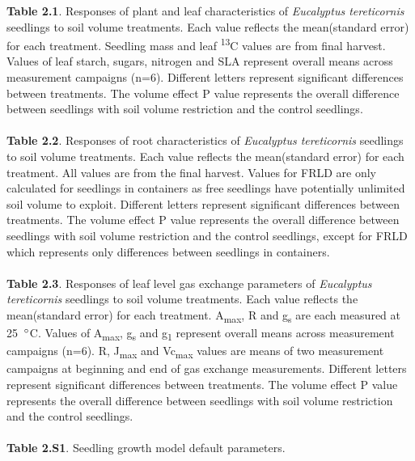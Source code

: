 \documentclass[a4paper]{article}\usepackage[]{graphicx}\usepackage[]{color}
\begin{document}
\textbf{Table 2.1}. Responses of plant and leaf characteristics of \textit{Eucalyptus tereticornis} seedlings to soil volume treatments. Each value reflects the mean(standard error) for each treatment. Seedling mass and leaf {\textdelta}\textsuperscript{13}C values are from final harvest. Values of leaf starch, sugars, nitrogen and SLA represent overall means across measurement campaigns (n=6). Different letters represent significant differences between treatments. The volume effect P value represents the overall difference between seedlings with soil volume restriction and the control seedlings.
\\
\\
\textbf{Table 2.2}. Responses of root characteristics of \textit{Eucalyptus tereticornis} seedlings to soil volume treatments. Each value reflects the mean(standard error) for each treatment. All values are from the final harvest. Values for FRLD are only calculated for seedlings in containers as free seedlings have potentially unlimited soil volume to exploit. Different letters represent significant differences between treatments. The volume effect P value represents the overall difference between seedlings with soil volume restriction and the control seedlings, except for FRLD which represents only differences between seedlings in containers.
\\
\\
\textbf{Table 2.3}. Responses of leaf level gas exchange parameters of \textit{Eucalyptus tereticornis} seedlings to soil volume treatments. Each value reflects the mean(standard error) for each treatment. A\textsubscript{max}, R and g\textsubscript{s} are each measured at 25~$\degree$C. Values of A\textsubscript{max}, g\textsubscript{s} and g\textsubscript{1} represent overall means across measurement campaigns (n=6). R, J\textsubscript{max} and Vc\textsubscript{max} values are means of two measurement campaigns at beginning and end of gas exchange measurements. Different letters represent significant differences between treatments. The volume effect P value represents the overall difference between seedlings with soil volume restriction and the control seedlings.
\\
\\
\textbf{Table 2.S1}. Seedling growth model default parameters.
\\
\\
\end{document}
